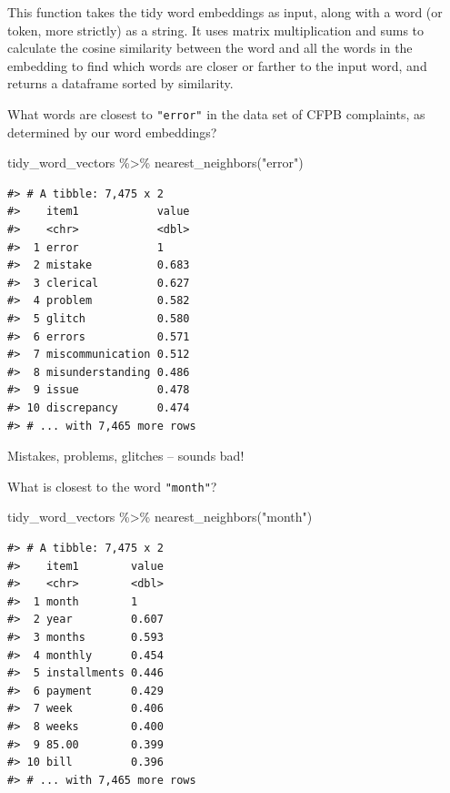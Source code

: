 \documentclass[
]{krantz}
\makeatletter
\newenvironment{Shaded}{\begin{snugshade}}{\end{snugshade}}
\newcommand{\FunctionTok}[1]{\textcolor[rgb]{0.00,0.00,0.00}{#1}}
\newcommand{\NormalTok}[1]{#1}
\newcommand{\SpecialCharTok}[1]{\textcolor[rgb]{0.00,0.00,0.00}{#1}}
\newcommand{\StringTok}[1]{\textcolor[rgb]{0.31,0.60,0.02}{#1}}
\newenvironment{kframe}{%
\medskip{}
\setlength{\fboxsep}{.8em}
 \def\at@end@of@kframe{}%
 \ifinner\ifhmode%
  \def\at@end@of@kframe{\end{minipage}}%
  \begin{minipage}{\columnwidth}%
 \fi\fi%
 \def\FrameCommand##1{\hskip\@totalleftmargin \hskip-\fboxsep
 \colorbox{shadecolor}{##1}\hskip-\fboxsep
     \hskip-\linewidth \hskip-\@totalleftmargin \hskip\columnwidth}%
 \MakeFramed {\advance\hsize-\width
   \@totalleftmargin\z@ \linewidth\hsize
   \@setminipage}}%
 {\par\unskip\endMakeFramed%
 \at@end@of@kframe}
\renewenvironment{Shaded}{\begin{kframe}}{\end{kframe}}
\makeatother
\begin{document}
This function takes the tidy word embeddings as input, along with a word (or token, more strictly) as a string. It uses matrix multiplication and sums to calculate the cosine similarity between the word and all the words in the embedding to find which words are closer or farther to the input word, and returns a dataframe sorted by similarity.

What words are closest to \texttt{"error"} in the data set of CFPB complaints, as determined by our word embeddings?

\begin{Shaded}
\begin{Highlighting}[]
\NormalTok{tidy\_word\_vectors }\SpecialCharTok{\%\textgreater{}\%}
    \FunctionTok{nearest\_neighbors}\NormalTok{(}\StringTok{"error"}\NormalTok{)}
\end{Highlighting}
\end{Shaded}

\begin{verbatim}
#> # A tibble: 7,475 x 2
#>    item1            value
#>    <chr>            <dbl>
#>  1 error            1    
#>  2 mistake          0.683
#>  3 clerical         0.627
#>  4 problem          0.582
#>  5 glitch           0.580
#>  6 errors           0.571
#>  7 miscommunication 0.512
#>  8 misunderstanding 0.486
#>  9 issue            0.478
#> 10 discrepancy      0.474
#> # ... with 7,465 more rows
\end{verbatim}

Mistakes, problems, glitches -- sounds bad!

What is closest to the word \texttt{"month"}?

\begin{Shaded}
\begin{Highlighting}[]
\NormalTok{tidy\_word\_vectors }\SpecialCharTok{\%\textgreater{}\%}
    \FunctionTok{nearest\_neighbors}\NormalTok{(}\StringTok{"month"}\NormalTok{)}
\end{Highlighting}
\end{Shaded}

\begin{verbatim}
#> # A tibble: 7,475 x 2
#>    item1        value
#>    <chr>        <dbl>
#>  1 month        1    
#>  2 year         0.607
#>  3 months       0.593
#>  4 monthly      0.454
#>  5 installments 0.446
#>  6 payment      0.429
#>  7 week         0.406
#>  8 weeks        0.400
#>  9 85.00        0.399
#> 10 bill         0.396
#> # ... with 7,465 more rows
\end{verbatim}
\end{document}
